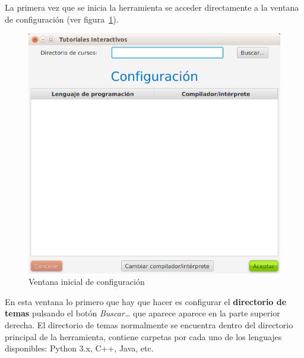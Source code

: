 \documentclass[]{article}
\begin{document}
La primera vez que se inicia la herramienta se acceder directamente a la ventana de configuración (ver figura~\ref{fig:config1}).
%
\begin{figure}[tbp]
\begin{center}
\includegraphics[scale=0.4]{Configuracion_vacia.png}
\end{center}
\caption{Ventana inicial de configuración\label{fig:config1}}
\end{figure}
%
En esta ventana lo primero que hay que hacer es configurar el \textbf{directorio de temas} pulsando el botón \emph{Buscar\ldots} que aparece aparece en la parte superior derecha. El directorio de temas normalmente se encuentra dentro del directorio principal de la herramienta, contiene carpetas por cada uno de los lenguajes disponibles: Python 3.x, C++, Java, etc. 
\end{document}
